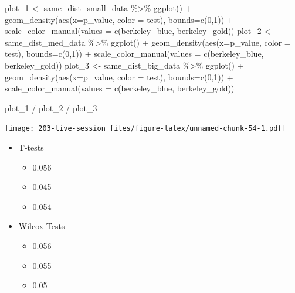 \documentclass[
]{book}
\newenvironment{Shaded}{\begin{snugshade}}{\end{snugshade}}
\newcommand{\AttributeTok}[1]{\textcolor[rgb]{0.77,0.63,0.00}{#1}}
\newcommand{\DecValTok}[1]{\textcolor[rgb]{0.00,0.00,0.81}{#1}}
\newcommand{\FunctionTok}[1]{\textcolor[rgb]{0.00,0.00,0.00}{#1}}
\newcommand{\NormalTok}[1]{#1}
\newcommand{\OtherTok}[1]{\textcolor[rgb]{0.56,0.35,0.01}{#1}}
\newcommand{\SpecialCharTok}[1]{\textcolor[rgb]{0.00,0.00,0.00}{#1}}
\providecommand{\tightlist}{%
  \setlength{\itemsep}{0pt}\setlength{\parskip}{0pt}}
\theoremstyle{definition}
\theoremstyle{definition}
\theoremstyle{definition}
\theoremstyle{definition}
\theoremstyle{remark}
\begin{document}
\begin{Shaded}
\begin{Highlighting}[]
\NormalTok{plot\_1 }\OtherTok{\textless{}{-}}\NormalTok{ same\_dist\_small\_data }\SpecialCharTok{\%\textgreater{}\%}
  \FunctionTok{ggplot}\NormalTok{() }\SpecialCharTok{+}
  \FunctionTok{geom\_density}\NormalTok{(}\FunctionTok{aes}\NormalTok{(}\AttributeTok{x=}\NormalTok{p\_value, }\AttributeTok{color =}\NormalTok{ test), }\AttributeTok{bounds=}\FunctionTok{c}\NormalTok{(}\DecValTok{0}\NormalTok{,}\DecValTok{1}\NormalTok{)) }\SpecialCharTok{+}
  \FunctionTok{scale\_color\_manual}\NormalTok{(}\AttributeTok{values =} \FunctionTok{c}\NormalTok{(berkeley\_blue, berkeley\_gold))}
\NormalTok{plot\_2 }\OtherTok{\textless{}{-}}\NormalTok{ same\_dist\_med\_data }\SpecialCharTok{\%\textgreater{}\%}
  \FunctionTok{ggplot}\NormalTok{() }\SpecialCharTok{+}
  \FunctionTok{geom\_density}\NormalTok{(}\FunctionTok{aes}\NormalTok{(}\AttributeTok{x=}\NormalTok{p\_value, }\AttributeTok{color =}\NormalTok{ test), }\AttributeTok{bounds=}\FunctionTok{c}\NormalTok{(}\DecValTok{0}\NormalTok{,}\DecValTok{1}\NormalTok{)) }\SpecialCharTok{+}
  \FunctionTok{scale\_color\_manual}\NormalTok{(}\AttributeTok{values =} \FunctionTok{c}\NormalTok{(berkeley\_blue, berkeley\_gold))}
\NormalTok{plot\_3 }\OtherTok{\textless{}{-}}\NormalTok{ same\_dist\_big\_data }\SpecialCharTok{\%\textgreater{}\%}
  \FunctionTok{ggplot}\NormalTok{() }\SpecialCharTok{+}
  \FunctionTok{geom\_density}\NormalTok{(}\FunctionTok{aes}\NormalTok{(}\AttributeTok{x=}\NormalTok{p\_value, }\AttributeTok{color =}\NormalTok{ test), }\AttributeTok{bounds=}\FunctionTok{c}\NormalTok{(}\DecValTok{0}\NormalTok{,}\DecValTok{1}\NormalTok{)) }\SpecialCharTok{+}
  \FunctionTok{scale\_color\_manual}\NormalTok{(}\AttributeTok{values =} \FunctionTok{c}\NormalTok{(berkeley\_blue, berkeley\_gold))}

\NormalTok{plot\_1 }\SpecialCharTok{/}\NormalTok{ plot\_2 }\SpecialCharTok{/}\NormalTok{ plot\_3}
\end{Highlighting}
\end{Shaded}

\texttt{[image: 203-live-session\_files/figure-latex/unnamed-chunk-54-1.pdf]}

\begin{itemize}
\tightlist
\item
  T-tests

  \begin{itemize}
  \tightlist
  \item
    0.056
  \item
    0.045
  \item
    0.054
  \end{itemize}
\item
  Wilcox Tests

  \begin{itemize}
  \tightlist
  \item
    0.056
  \item
    0.055
  \item
    0.05
  \end{itemize}
\end{itemize}
\end{document}

